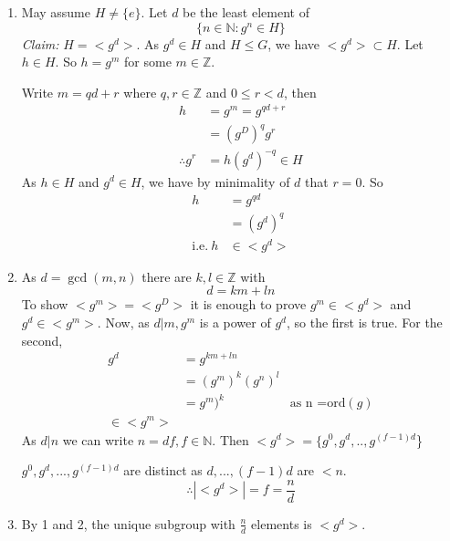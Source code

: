 \documentclass{report}
\theoremstyle{remark}
\theoremstyle{definition}
\theoremstyle{definition}
\theoremstyle{theorem}
\begin{document}
\begin{enumerate}[label=\textcircled{\tiny{\arabic*}}]
    \item May assume $H \neq \{e\}$. Let $d$ be the least element of
    \[\{n \in \mathbb{N}:g^n\in H\}\]
    \emph{Claim:} $H=<g^d>$. As $g^d \in H$ and $H \leq G$, we have $<g^d> \subset H$. Let $h \in H$. So $h=g^m$ for some $m \in \mathbb{Z}$.\par
    Write $m=qd+r$ where $q, r \in \mathbb{Z}$ and $0 \leq r <d$, then
    \begin{align*}
        h&=g^m=g^{qd+r}\\
        &=(g^D)^qg^r\\
        \therefore g^r&=h(g^d)^{-q} \in H
    \end{align*}
    As $h \in H$ and $g^d \in H$, we have by minimality of $d$ that $r=0$. So
    \begin{align*}
        h&= g^{qd}\\
        &=(g^d)^q\\
        \text{i.e.} \> h &\in <g^d>
    \end{align*}
    \item As $d = \gcd(m,n)$ there are $k, l \in \mathbb{Z}$ with 
    \[d=km+ln\]
    To show $<g^m>=<g^D>$ it is enough to prove $g^m \in <g^d>$ and $g^d\in <g^m>$. Now, as $d|m, g^m$ is a power of $g^d$, so the first is true. For the second,
    \begin{align*}
        g^d&=g^{km+ln}\\
        &=(g^m)^k(g^n)^l\\
        &=g^m)^k &\text{as n =$\mathrm{ord}(g)$}\\
        \in <g^m>
    \end{align*}
    As $d|n$ we can write $n=df, f \in \mathbb{N}$. Then $<g^d>=\{g^0,g^d,..,g^{(f-1)d}$\}\par
    $g^0,g^d,...,g^{(f-1)d}$ are distinct as $d,...,(f-1)d$ are $<n$.
    \[\therefore |<g^d>|=f=\frac{n}{d}\]
    \item By \textcircled{\tiny{1}} and \textcircled{\tiny{2}}, the unique subgroup with $\frac{n}{d}$ elements is $<g^d>$.
\end{enumerate}
\end{document}
